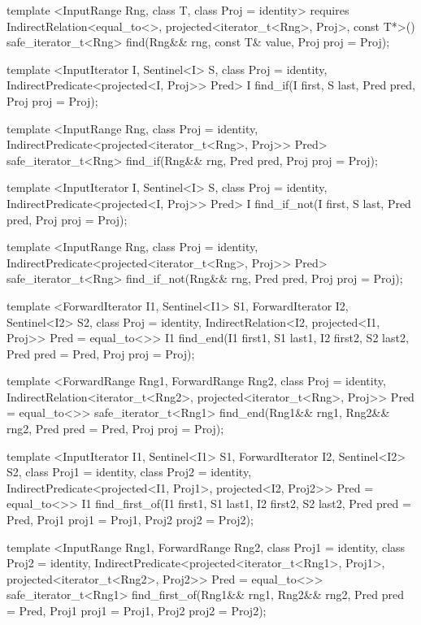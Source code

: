 \begin{codeblock}
{{{{  template <InputRange Rng, class T, class Proj = identity>
    requires IndirectRelation<equal_to<>, projected<iterator_t<Rng>, Proj>, const T*>()
    safe_iterator_t<Rng>
      find(Rng&& rng, const T& value, Proj proj = Proj{});

  template <InputIterator I, Sentinel<I> S, class Proj = identity,
      IndirectPredicate<projected<I, Proj>> Pred>
    I find_if(I first, S last, Pred pred, Proj proj = Proj{});

  template <InputRange Rng, class Proj = identity,
      IndirectPredicate<projected<iterator_t<Rng>, Proj>> Pred>
    safe_iterator_t<Rng>
      find_if(Rng&& rng, Pred pred, Proj proj = Proj{});

  template <InputIterator I, Sentinel<I> S, class Proj = identity,
      IndirectPredicate<projected<I, Proj>> Pred>
    I find_if_not(I first, S last, Pred pred, Proj proj = Proj{});

  template <InputRange Rng, class Proj = identity,
      IndirectPredicate<projected<iterator_t<Rng>, Proj>> Pred>
    safe_iterator_t<Rng>
      find_if_not(Rng&& rng, Pred pred, Proj proj = Proj{});

  template <ForwardIterator I1, Sentinel<I1> S1, ForwardIterator I2,
      Sentinel<I2> S2, class Proj = identity,
      IndirectRelation<I2, projected<I1, Proj>> Pred = equal_to<>>
    I1
      find_end(I1 first1, S1 last1, I2 first2, S2 last2,
               Pred pred = Pred{}, Proj proj = Proj{});

  template <ForwardRange Rng1, ForwardRange Rng2, class Proj = identity,
      IndirectRelation<iterator_t<Rng2>,
        projected<iterator_t<Rng>, Proj>> Pred = equal_to<>>
    safe_iterator_t<Rng1>
      find_end(Rng1&& rng1, Rng2&& rng2, Pred pred = Pred{}, Proj proj = Proj{});

  template <InputIterator I1, Sentinel<I1> S1, ForwardIterator I2, Sentinel<I2> S2,
      class Proj1 = identity, class Proj2 = identity,
      IndirectPredicate<projected<I1, Proj1>, projected<I2, Proj2>> Pred = equal_to<>>
    I1
      find_first_of(I1 first1, S1 last1, I2 first2, S2 last2,
                    Pred pred = Pred{},
                    Proj1 proj1 = Proj1{}, Proj2 proj2 = Proj2{});

  template <InputRange Rng1, ForwardRange Rng2, class Proj1 = identity,
      class Proj2 = identity,
      IndirectPredicate<projected<iterator_t<Rng1>, Proj1>,
        projected<iterator_t<Rng2>, Proj2>> Pred = equal_to<>>
    safe_iterator_t<Rng1>
      find_first_of(Rng1&& rng1, Rng2&& rng2,
                    Pred pred = Pred{},
                    Proj1 proj1 = Proj1{}, Proj2 proj2 = Proj2{});

}}}}
\end{codeblock}
